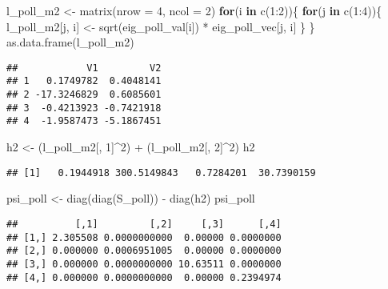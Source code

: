 \documentclass[
]{article}
\newenvironment{Shaded}{\begin{snugshade}}{\end{snugshade}}
\newcommand{\AttributeTok}[1]{\textcolor[rgb]{0.77,0.63,0.00}{#1}}
\newcommand{\ControlFlowTok}[1]{\textcolor[rgb]{0.13,0.29,0.53}{\textbf{#1}}}
\newcommand{\DecValTok}[1]{\textcolor[rgb]{0.00,0.00,0.81}{#1}}
\newcommand{\FunctionTok}[1]{\textcolor[rgb]{0.00,0.00,0.00}{#1}}
\newcommand{\NormalTok}[1]{#1}
\newcommand{\OtherTok}[1]{\textcolor[rgb]{0.56,0.35,0.01}{#1}}
\newcommand{\SpecialCharTok}[1]{\textcolor[rgb]{0.00,0.00,0.00}{#1}}
\begin{document}
\begin{Shaded}
\begin{Highlighting}[]
\NormalTok{l\_poll\_m2 }\OtherTok{\textless{}{-}} \FunctionTok{matrix}\NormalTok{(}\AttributeTok{nrow =} \DecValTok{4}\NormalTok{, }\AttributeTok{ncol =} \DecValTok{2}\NormalTok{)}
\ControlFlowTok{for}\NormalTok{(i }\ControlFlowTok{in} \FunctionTok{c}\NormalTok{(}\DecValTok{1}\SpecialCharTok{:}\DecValTok{2}\NormalTok{))\{}
  \ControlFlowTok{for}\NormalTok{(j }\ControlFlowTok{in} \FunctionTok{c}\NormalTok{(}\DecValTok{1}\SpecialCharTok{:}\DecValTok{4}\NormalTok{))\{}
\NormalTok{    l\_poll\_m2[j, i] }\OtherTok{\textless{}{-}} \FunctionTok{sqrt}\NormalTok{(eig\_poll\_val[i]) }\SpecialCharTok{*}\NormalTok{ eig\_poll\_vec[j, i]}
\NormalTok{  \}}
\NormalTok{\}}
\FunctionTok{as.data.frame}\NormalTok{(l\_poll\_m2)}
\end{Highlighting}
\end{Shaded}

\begin{verbatim}
##            V1         V2
## 1   0.1749782  0.4048141
## 2 -17.3246829  0.6085601
## 3  -0.4213923 -0.7421918
## 4  -1.9587473 -5.1867451
\end{verbatim}

\begin{Shaded}
\begin{Highlighting}[]
\NormalTok{h2 }\OtherTok{\textless{}{-}}\NormalTok{ (l\_poll\_m2[, }\DecValTok{1}\NormalTok{]}\SpecialCharTok{\^{}}\DecValTok{2}\NormalTok{) }\SpecialCharTok{+}\NormalTok{ (l\_poll\_m2[, }\DecValTok{2}\NormalTok{]}\SpecialCharTok{\^{}}\DecValTok{2}\NormalTok{)}
\NormalTok{h2}
\end{Highlighting}
\end{Shaded}

\begin{verbatim}
## [1]   0.1944918 300.5149843   0.7284201  30.7390159
\end{verbatim}

\begin{Shaded}
\begin{Highlighting}[]
\NormalTok{psi\_poll }\OtherTok{\textless{}{-}} \FunctionTok{diag}\NormalTok{(}\FunctionTok{diag}\NormalTok{(S\_poll)) }\SpecialCharTok{{-}} \FunctionTok{diag}\NormalTok{(h2)}
\NormalTok{psi\_poll}
\end{Highlighting}
\end{Shaded}

\begin{verbatim}
##          [,1]         [,2]     [,3]      [,4]
## [1,] 2.305508 0.0000000000  0.00000 0.0000000
## [2,] 0.000000 0.0006951005  0.00000 0.0000000
## [3,] 0.000000 0.0000000000 10.63511 0.0000000
## [4,] 0.000000 0.0000000000  0.00000 0.2394974
\end{verbatim}
\end{document}
